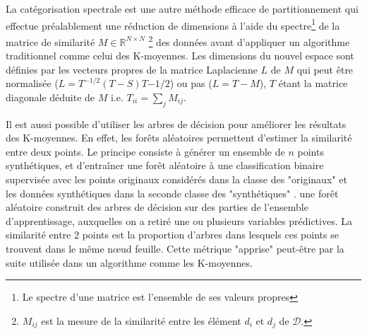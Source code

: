La catégorisation spectrale est une autre méthode efficace de partitionnement qui effectue préalablement une réduction de dimensions à l'aide du spectre\footnote{Le spectre d'une matrice est l'ensemble de ses valeurs propres} de la matrice de similarité $M \in \mathbb{R}^{N \times N}$ \footnote{$M_{ij}$ est la mesure de la similarité entre les élément $d_i$ et $d_j$ de $\mathcal{D}$.} des données  avant d'appliquer un algorithme traditionnel comme celui des K-moyennes. Les dimensions du nouvel espace sont définies par les vecteurs propres de la matrice Laplacienne $L$ de $M$ \citep{shi2000spectralClustering, von2007tutorialSpectralClustering} qui peut être normalisée ($L = T^{-1/2}(T-S)T{-1/2}$) ou pas ($L = T - M$), $T$ étant la matrice diagonale déduite de $M$ i.e. $T_{ii} = \sum\limits_j M_{ij}$. 

Il est aussi possible d'utiliser les arbres de décision pour améliorer les résultats des K-moyennes. En effet, les forêts aléatoires \citep{breiman2001randomforest} permettent d'estimer la similarité entre deux points. Le principe consiste à générer un ensemble de $n$ points synthétiques, et d'entraîner une forêt aléatoire à une classification binaire supervisée avec les points originaux considérés dans la classe des "originaux" et les données synthétiques dans la seconde classe des "synthétiques" \citep{afanador2016unsupervisedrandomforest}. %
une forêt aléatoire construit des arbres de décision sur des parties de l'ensemble d'apprentissage, auxquelles on a retiré une ou plusieurs variables prédictives. La similarité entre 2 points est la proportion d'arbres dans lesquels ces points se trouvent dans le même nœud feuille. Cette métrique "apprise" peut-être par la suite utilisée dans un algorithme comme les K-moyennes.


